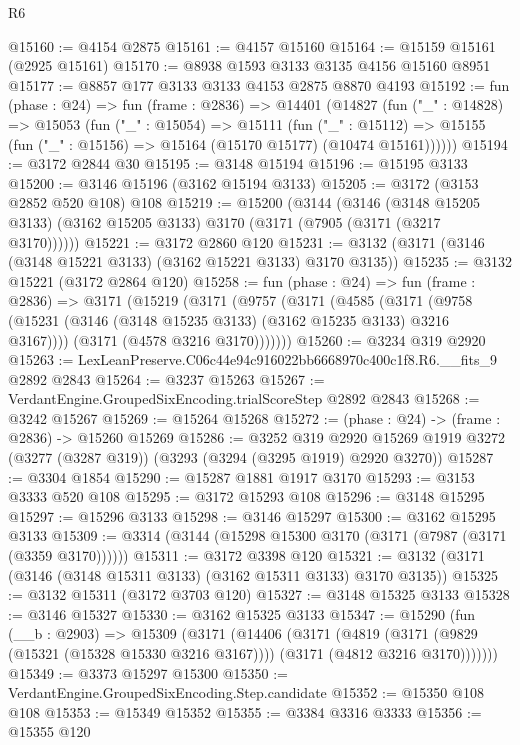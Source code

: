 \begin{lexlean}{R6}
\begin{coremodule}
@15160 := @4154 @2875
@15161 := @4157 @15160
@15164 := @15159 @15161 (@2925 @15161)
@15170 := @8938 @1593 @3133 @3135 @4156 @15160 @8951
@15177 := @8857 @177 @3133 @3133 @4153 @2875 @8870 @4193
@15192 := fun (phase : @24) =>
  fun (frame : @2836) =>
  @14401
    (@14827
      (fun ("_" : @14828) =>
      @15053
        (fun ("_" : @15054) =>
        @15111
          (fun ("_" : @15112) =>
          @15155 (fun ("_" : @15156) => @15164 (@15170 @15177) (@10474 @15161))))))
@15194 := @3172 @2844 @30
@15195 := @3148 @15194
@15196 := @15195 @3133
@15200 := @3146 @15196 (@3162 @15194 @3133)
@15205 := @3172 (@3153 @2852 @520 @108) @108
@15219 := @15200
    (@3144
      (@3146 (@3148 @15205 @3133) (@3162 @15205 @3133) @3170 (@3171 (@7905 (@3171 (@3217 @3170))))))
@15221 := @3172 @2860 @120
@15231 := @3132 (@3171 (@3146 (@3148 @15221 @3133) (@3162 @15221 @3133) @3170 @3135))
@15235 := @3132 @15221 (@3172 @2864 @120)
@15258 := fun (phase : @24) =>
  fun (frame : @2836) =>
  @3171
    (@15219
      (@3171
        (@9757
          (@3171
            (@4585
              (@3171 (@9758 (@15231 (@3146 (@3148 @15235 @3133) (@3162 @15235 @3133) @3216 @3167))))
              (@3171 (@4578 @3216 @3170)))))))
@15260 := @3234 @319 @2920
@15263 := LexLeanPreserve.C06c44e94c916022bb6668970c400c1f8.R6.__fits_9 @2892 @2843
@15264 := @3237 @15263
@15267 := VerdantEngine.GroupedSixEncoding.trialScoreStep @2892 @2843
@15268 := @3242 @15267
@15269 := @15264 @15268
@15272 := (phase : @24) -> (frame : @2836) -> @15260 @15269
@15286 := @3252
    @319
    @2920
    @15269
    @1919
    @3272
    (@3277 (@3287 @319))
    (@3293 (@3294 (@3295 @1919) @2920 @3270))
@15287 := @3304 @1854
@15290 := @15287 @1881 @1917 @3170
@15293 := @3153 @3333 @520 @108
@15295 := @3172 @15293 @108
@15296 := @3148 @15295
@15297 := @15296 @3133
@15298 := @3146 @15297
@15300 := @3162 @15295 @3133
@15309 := @3314 (@3144 (@15298 @15300 @3170 (@3171 (@7987 (@3171 (@3359 @3170))))))
@15311 := @3172 @3398 @120
@15321 := @3132 (@3171 (@3146 (@3148 @15311 @3133) (@3162 @15311 @3133) @3170 @3135))
@15325 := @3132 @15311 (@3172 @3703 @120)
@15327 := @3148 @15325 @3133
@15328 := @3146 @15327
@15330 := @3162 @15325 @3133
@15347 := @15290
    (fun (__b : @2903) =>
    @15309
      (@3171
        (@14406
          (@3171
            (@4819
              (@3171 (@9829 (@15321 (@15328 @15330 @3216 @3167))))
              (@3171 (@4812 @3216 @3170)))))))
@15349 := @3373 @15297 @15300
@15350 := VerdantEngine.GroupedSixEncoding.Step.candidate
@15352 := @15350 @108 @108
@15353 := @15349 @15352
@15355 := @3384 @3316 @3333
@15356 := @15355 @120

\end{coremodule}
\end{lexlean}
